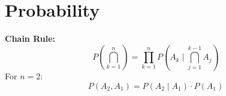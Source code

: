 \section{Probability}
\begin{framed}
  \textbf{Chain Rule:}
  \begin{equation}
    P \left( \bigcap_{k=1}^n \right) = \prod_{k=1}^n P \left( A_k \mid \bigcap_{j=1}^{k-1} A_j \right)
  \end{equation}
  For $n=2$:
  \begin{equation}
    P \left( A_2, A_1 \right) = P \left( A_2 \mid A_1 \right) \cdot P \left( A_1 \right)
  \end{equation}
\end{framed}